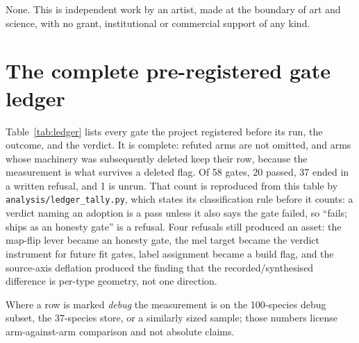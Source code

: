 \documentclass[10pt,twocolumn,a4paper]{article}
\begin{document}
None. This is independent work by an artist, made at the boundary of art and science, with no
grant, institutional or commercial support of any kind.




\appendix

\onecolumn
\section{The complete pre-registered gate ledger}
\label{app:ledger}

Table~\ref{tab:ledger} lists every gate the project registered before its run, the outcome,
and the verdict. It is complete: refuted arms are not omitted, and arms whose machinery was
subsequently deleted keep their row, because the measurement is what survives a deleted flag.
Of 58 gates, 20 passed, 37 ended in a written refusal, and 1 is unrun. That count is
reproduced from this table by \texttt{analysis/ledger\_tally.py}, which states its
classification rule before it counts: a verdict naming an adoption is a pass unless it also
says the gate failed, so ``fails; ships as an honesty gate'' is a refusal. Four
refusals still produced an asset: the map-flip lever became an honesty gate, the mel target
became the verdict instrument for future fit gates, label assignment became a build flag, and
the source-axis deflation produced the finding that the recorded/synthesised difference is
per-type geometry, not one direction.

Where a row is marked \emph{debug} the measurement is on the 100-species debug subset, the
37-species store, or a similarly sized sample; those numbers license arm-against-arm
comparison and not absolute claims.
\end{document}
